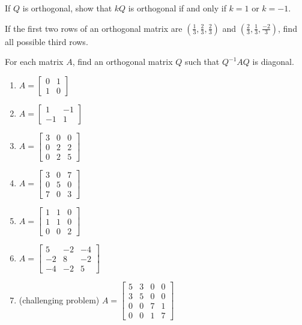 \documentclass{ximera}
\begin{document}
\begin{problem}\label{prob:scalar_othogonal}
If $Q$ is orthogonal, show that $kQ$ is orthogonal if and only if $k = 1$ or $k = -1$.
\end{problem}

\begin{problem}\label{prob:thirdrow}
If the first two rows of an orthogonal matrix are $(\frac{1}{3}, \frac{2}{3}, \frac{2}{3})$ and $(\frac{2}{3}, \frac{1}{3}, \frac{-2}{3})$, find all possible third rows.
\end{problem}

\begin{problem}\label{prob:findQ}
For each matrix $A$, find an orthogonal matrix $Q$ such that $Q^{-1}AQ$ is diagonal.

\begin{enumerate}
\item\label{prob:findQa} $A = \begin{bmatrix}
0 & 1 \\
1 & 0
\end{bmatrix}$

\item\label{prob:findQb} $A = \begin{bmatrix}
1 & -1 \\
-1 & 1
\end{bmatrix}$

\item\label{prob:findQc} $A = \begin{bmatrix}
3 & 0 & 0 \\
0 & 2 & 2 \\
0 & 2 & 5
\end{bmatrix}$

\item\label{prob:findQd} $A = \begin{bmatrix}
3 & 0 & 7 \\
0 & 5 & 0 \\
7 & 0 & 3
\end{bmatrix}$

\item\label{prob:findQe} $A = \begin{bmatrix}
1 & 1 & 0 \\
1 & 1 & 0 \\
0 & 0 & 2
\end{bmatrix}$

\item $A = \begin{bmatrix}
5 & -2 & -4 \\
-2 & 8 & -2\\
-4 & -2 & 5
\end{bmatrix}$
\item\label{prob:findQf} (challenging problem) $A = \begin{bmatrix}
5 & 3 & 0 & 0 \\
3 & 5 & 0 & 0 \\
0 & 0 & 7 & 1 \\
0 & 0 & 1 & 7
\end{bmatrix}$


\end{enumerate}
\end{problem}
\end{document}
